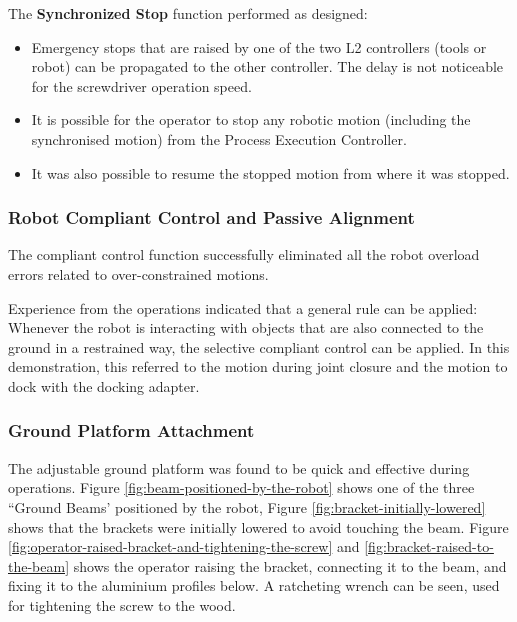 The \textbf{Synchronized Stop} function  performed as designed:
\begin{itemize}
    \item Emergency stops that are raised by one of the two L2 controllers (tools or robot) can be propagated to the other controller. The delay is not noticeable for the screwdriver operation speed.
    \item It is possible for the operator to stop any robotic motion (including the synchronised motion) from the Process Execution Controller.
    \item It was also possible to resume the stopped motion from where it was stopped.
\end{itemize}

\subsubsection{Robot Compliant Control and Passive Alignment}
\label{subsubsection:exploration-4-robot-compliant-control-and-passive-alignment}

The compliant control function  successfully eliminated all the robot overload errors related to over-constrained motions. 

Experience from the operations indicated that a general rule can be applied: Whenever the robot is interacting with objects that are also connected to the ground in a restrained way, the selective compliant control can be applied. In this demonstration, this referred to the motion during joint closure and the motion to dock with the docking adapter.

\subsubsection{Ground Platform Attachment}
\label{subsubsection:exploration-4-ground-platform-attachment}

The adjustable ground platform  was found to be quick and effective during operations. Figure \ref{fig:beam-positioned-by-the-robot} shows one of the three “Ground Beams' positioned by the robot, Figure \ref{fig:bracket-initially-lowered} shows that the brackets were initially lowered to avoid touching the beam. Figure \ref{fig:operator-raised-bracket-and-tightening-the-screw} and \ref{fig:bracket-raised-to-the-beam} shows the operator raising the bracket, connecting it to the beam, and fixing it to the aluminium profiles below. A ratcheting wrench can be seen, used for tightening the screw to the wood.

